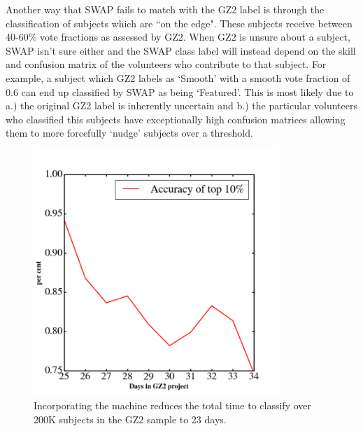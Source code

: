 \documentclass[twocolumn]{aastex6}
\begin{document}
Another way that SWAP fails to match with the GZ2 label is through the classification
of subjects which are ``on the edge". These subjects receive between 40-60\% vote 
fractions as assessed by GZ2. When GZ2 is unsure about a subject, SWAP isn't sure either
and the SWAP class label will instead depend on the skill and confusion matrix of the 
volunteers who contribute to that subject. For example, a subject which GZ2 labels as 
`Smooth' with a smooth vote fraction of 0.6 can end up classified by SWAP as being `Featured'. 
This is most likely due to a.) the original GZ2 label is inherently uncertain and 
b.) the particular volunteers who classified this subjects have exceptionally high 
confusion matrices allowing them to more forcefully `nudge' subjects over a threshold. 

\begin{figure}[t!]
\includegraphics[width=3.65in]{figures/MLevaluation_GZ2_sup_PLPD5_p5_flipfeature2b_RF_accuracy.png}
\caption{Incorporating the machine reduces the total time to classify over 200K subjects in the GZ2 sample to 23 days. \label{fig: machine accuracy}}
\end{figure}
\end{document}
